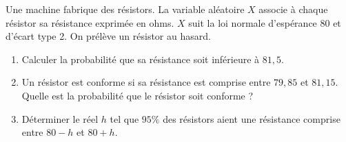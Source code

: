 \begin{exercice_cours}[\quad]{}

	Une machine fabrique des résistors. La variable aléatoire $X$ associe à chaque résistor sa résistance exprimée en ohms. $X$ suit la loi normale d'espérance 80 et d'écart type 2.
On prélève un résistor au hasard.

\begin{enumerate}
	\item Calculer la probabilité que sa résistance soit inférieure à $81,5$.
	\item Un résistor est conforme si sa résistance est comprise entre $79,85$ et $81,15$. Quelle est la probabilité que le résistor soit conforme ?
	\item Déterminer le réel $h$ tel que $95 \%$ des résistors aient une résistance comprise entre $80-h$ et $80+h$.
\end{enumerate}
\end{exercice_cours}

